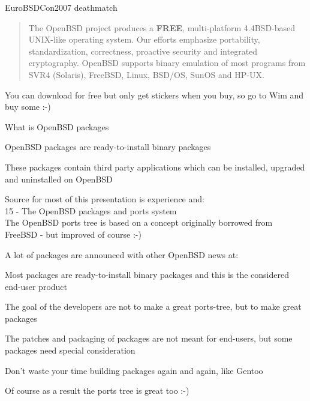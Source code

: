 \documentclass[18pt,landscape,a4paper]{foils}
\begin{document}
{EuroBSDCon2007 deathmatch}




\begin{quote}
The OpenBSD project produces a {\bf FREE}, multi-platform 4.4BSD-based
UNIX-like operating system. Our efforts emphasize portability,
standardization, correctness, proactive security and integrated
cryptography. OpenBSD supports binary emulation of most programs from
SVR4 (Solaris), FreeBSD, Linux, BSD/OS, SunOS and HP-UX. 
\end{quote}

You can download for free but only get stickers when you buy, so go to
Wim and buy some :-)


\begin{list1}
\item What is OpenBSD packages
\item OpenBSD packages are ready-to-install binary packages
\item These packages contain third party applications 
which can be installed, upgraded and uninstalled on OpenBSD
\item Source for most of this presentation is experience and:\\
15 - The OpenBSD packages and ports system\\
The OpenBSD ports tree is based on a concept originally borrowed from
FreeBSD - but improved of course :-)
\item A lot of packages are announced with other OpenBSD news at:\\
\end{list1}


\begin{list1}
\item Most packages are ready-to-install binary packages and this is
  the considered end-user product
\item The goal of the developers are not to make a great ports-tree,
  but to make great packages
\item The patches and packaging of packages are not meant for
  end-users, but some packages need special consideration
\item Don't waste your time building packages again and again, like Gentoo
\item Of course as a result the ports tree is great too :-)
\end{list1}
\end{document}
